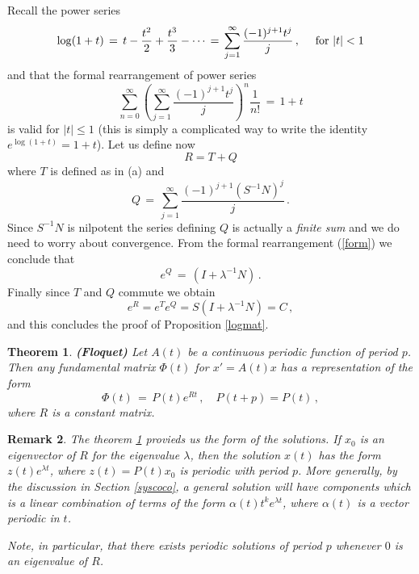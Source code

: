 \documentclass[12pt]{report}
\newtheorem{theorem}{Theorem}[section]
\newtheorem{remark}[theorem]{Remark}
\def\eqref#1{(\ref{#1})}
\def\qed{\hbox{\hskip 6pt\vrule width6pt height7pt depth1pt
    \hskip1pt}\bigskip}
\begin{document}
Recall the power series 
\begin{equation}
\log(1+t)\,=\, t- \frac{t^2}{2} + \frac{t^3}{3} - \cdots \,=\, 
\sum_{j=1}^\infty \frac{(-1)^{j+1}t^j}{j}\,, \quad {\rm ~for~}  |t| < 1
\end{equation}
and that the formal 
rearrangement of power series
\begin{equation}\label{form}
\sum_{n=0}^\infty \left( \sum_{j=1}^\infty \frac{(-1)^{j+1}t^j}{j} \right)^n 
\frac{1}{n!} \,=\, 1 +t 
\end{equation}
is valid for $|t| \le 1$ (this is simply a complicated way to write the identity $e^{\log(1+t)}=1+t$).
Let us define now
\begin{equation}
R = T + Q 
\end{equation}
where $T$ is defined as in (a) and 
\begin{equation}
Q \,=\, \sum_{j=1}^\infty \frac{(-1)^{j+1}  (S^{-1}N)^j}{j  }\,.
\end{equation}
Since $S^{-1}N$ is nilpotent the series defining $Q$ is actually a {\em finite sum} 
and we do need to worry about convergence.  From the formal rearrangement \eqref{form}
we conclude that 
\begin{equation}
e^{Q} \,=\, (I + \lambda^{-1}N) \,.
\end{equation}
Finally since $T$ and $Q$ commute we obtain 
\begin{equation}
e^{R} = e^{T} e^{Q} = S (I + \lambda^{-1}N) = C \,,
\end{equation}
and this concludes the proof of Proposition \ref{logmat}.  \hfill \qed


\begin{theorem}\label{floquet}{\bf (Floquet)} Let $A(t)$ be a continuous 
periodic function of period $p$. Then any fundamental matrix $\Phi(t)$
for $x'=A(t)x$ has a representation of the form
\begin{equation}
\Phi(t)\,=\, P(t) e^{Rt} \,, \quad P(t+p) = P(t)\,,
\end{equation}
where $R$ is a constant matrix. 
\end{theorem}


\begin{remark}{\rm  
The theorem \ref{floquet} provieds us the form of the solutions.  If
$x_0$ is an eigenvector of $R$ for the eigenvalue $\lambda$, then the
solution $x(t)$ has the form $z(t) e^{\lambda t}$, where $z(t)=
P(t)x_0$ is periodic with period $p$.  More generally, by the
discussion in Section \ref{syscoco}, a general
solution will have components which is a linear combination of terms
of the form $\alpha(t)t^k e^{\lambda t}$, where $\alpha(t)$ is a
vector periodic in $t$. 

Note, in particular, that there exists periodic solutions of period $p$ 
whenever $0$ is an eigenvalue of $R$. }
\end{remark}
  
\end{document}
